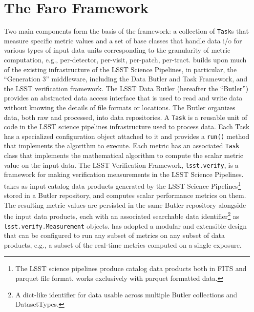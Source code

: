 \section{The Faro Framework} \label{sec:faro}

Two main components form the basis of the \faro framework: a collection of \texttt{Task}s that measure specific metric values and a set of base classes that handle data i/o for various types of input data units corresponding to the granularity of metric computation, e.g., per-detector, per-visit, per-patch, per-tract.
\faro builds upon much of the existing infrastructure of the LSST Science Pipelines, in particular, the ``Generation 3'' middleware, including the Data Butler and Task Framework\cite{dmtn-229}, and the LSST verification framework\cite{SQR-019}.
The LSST Data Butler (hereafter the ``Butler'') provides an abstracted data access interface that is used to read and write data without knowing the details of file formats or locations.
The Butler organizes data, both raw and processed, into data repositories.
A \texttt{Task} is a reusable unit of code in the LSST science pipelines infrastructure used to process data.
Each Task has a specialized configuration object attached to it and provides a \texttt{run()} method that implements the algorithm to execute. 
Each \faro metric has an associated \texttt{Task} class that implements the mathematical algorithm to compute the scalar metric value on the input data.
The LSST Verification Framework, \texttt{lsst.verify}, is a framework for making verification measurements in the LSST Science Pipelines.
\faro takes as input catalog data products generated by the LSST Science Pipelines\footnote{The LSST science pipelines produce catalog data products both in FITS and parquet file format. \faro works exclusively with parquet formatted data.} stored in a Butler repository,
 and computes scalar performance metrics on them. 
The resulting metric values
are persisted in the same Butler repository alongside the input data products, each with an associated searchable data identifier\footnote{A dict-like identifier for data usable across multiple Butler collections and DatasetTypes.} as \texttt{lsst.verify.Measurement} objects.
\faro has adopted a modular and extensible design that can be configured to run any subset of metrics on any subset of data products, e.g., a subset of the real-time metrics computed on a single exposure.

